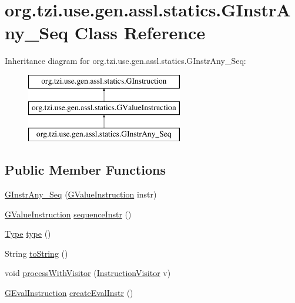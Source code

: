\hypertarget{classorg_1_1tzi_1_1use_1_1gen_1_1assl_1_1statics_1_1_g_instr_any___seq}{\section{org.\-tzi.\-use.\-gen.\-assl.\-statics.\-G\-Instr\-Any\-\_\-\-Seq Class Reference}
\label{classorg_1_1tzi_1_1use_1_1gen_1_1assl_1_1statics_1_1_g_instr_any___seq}
}
Inheritance diagram for org.\-tzi.\-use.\-gen.\-assl.\-statics.\-G\-Instr\-Any\-\_\-\-Seq\-:\begin{figure}[H]
\begin{center}
\leavevmode
\includegraphics[height=3.000000cm]{classorg_1_1tzi_1_1use_1_1gen_1_1assl_1_1statics_1_1_g_instr_any___seq}
\end{center}
\end{figure}
\subsection*{Public Member Functions}
\begin{DoxyCompactItemize}
\item 
\hyperlink{classorg_1_1tzi_1_1use_1_1gen_1_1assl_1_1statics_1_1_g_instr_any___seq_a866b8ade56122569640b233b3b80892c}{G\-Instr\-Any\-\_\-\-Seq} (\hyperlink{interfaceorg_1_1tzi_1_1use_1_1gen_1_1assl_1_1statics_1_1_g_value_instruction}{G\-Value\-Instruction} instr)
\item 
\hyperlink{interfaceorg_1_1tzi_1_1use_1_1gen_1_1assl_1_1statics_1_1_g_value_instruction}{G\-Value\-Instruction} \hyperlink{classorg_1_1tzi_1_1use_1_1gen_1_1assl_1_1statics_1_1_g_instr_any___seq_a2d9a2c09aa8a318c46cd64f66373bb48}{sequence\-Instr} ()
\item 
\hyperlink{interfaceorg_1_1tzi_1_1use_1_1uml_1_1ocl_1_1type_1_1_type}{Type} \hyperlink{classorg_1_1tzi_1_1use_1_1gen_1_1assl_1_1statics_1_1_g_instr_any___seq_a5469207079aca61ca857391b6f37dfb7}{type} ()
\item 
String \hyperlink{classorg_1_1tzi_1_1use_1_1gen_1_1assl_1_1statics_1_1_g_instr_any___seq_a7f2cac02dd64713f05dd5ca4b756cc11}{to\-String} ()
\item 
void \hyperlink{classorg_1_1tzi_1_1use_1_1gen_1_1assl_1_1statics_1_1_g_instr_any___seq_a3db6e67c60144cf1100573eac50c7695}{process\-With\-Visitor} (\hyperlink{interfaceorg_1_1tzi_1_1use_1_1gen_1_1assl_1_1statics_1_1_instruction_visitor}{Instruction\-Visitor} v)
\item 
\hyperlink{classorg_1_1tzi_1_1use_1_1gen_1_1assl_1_1dynamics_1_1_g_eval_instruction}{G\-Eval\-Instruction} \hyperlink{classorg_1_1tzi_1_1use_1_1gen_1_1assl_1_1statics_1_1_g_instr_any___seq_aa43b1da312513a70fa233249de91fb0f}{create\-Eval\-Instr} ()
\end{DoxyCompactItemize}


